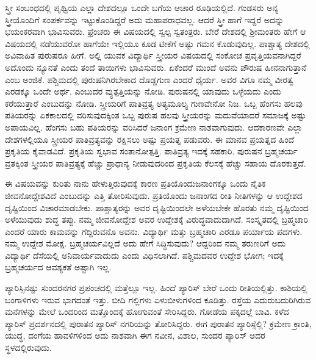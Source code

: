 ಸ್ತ್ರೀ ಸಂಬಂಧದಲ್ಲಿ ಪೃಥ್ವಿಯ ಎಲ್ಲಾ ದೇಶದಲ್ಲೂ ಒಂದೇ ಬಗೆಯ ಆಚಾರ ರೂಢಿಯಲ್ಲಿದೆ. ಗಂಡಸರು ಅನ್ಯ ಸ್ತ್ರೀಯೊಂದಿಗೆ ಸಂಪರ್ಕವನ್ನು ಇಟ್ಟುಕೊಂಡಿದ್ದರೆ ಅದು ಮಹಾಪರಾಧವಲ್ಲ. ಆದರೆ ಸ್ತ್ರೀ ಹಾಗೆ ಇದ್ದರೆ ಅದನ್ನು ಭಯಂಕರವಾಗಿ ಭಾವಿಸುವರು. ಫ್ರೆಂಚರು ಈ ವಿಷಯದಲ್ಲಿ ಸ್ವಲ್ಪ ಸ್ವತಂತ್ರರು. ಬೇರೆ ದೇಶದಲ್ಲಿ ಶ‍್ರೀಮಂತರು ಹೇಗೆ ಆ ವಿಷಯದಲ್ಲಿ ನಡೆಯುವರೋ ಹಾಗೆಯೇ ಇಲ್ಲಿಯೂ ಕೂಡ ಟೀಕೆಗೆ ಅಷ್ಟು ಗಮನ ಕೊಡುವುದಿಲ್ಲ. ಪಾಶ್ಚಾತ್ಯ ದೇಶದಲ್ಲಿ ಅವಿವಾಹಿತ ಪುರುಷರೂ ಹೀಗೆ. ಅಲ್ಲಿ ಯುವಕ ವಿದ್ಯಾರ್ಥಿ ಸ್ತ್ರೀಯರ ವಿಷಯದಲ್ಲಿ ಸಂಕೋಚ ಪ್ರವೃತ್ತಿಯವನಾಗಿದ್ದರೆ ಅದೊಂದು ನ್ಯೂನತೆ ಎಂದು ತಂದೆ ತಾಯಿಗಳು ಭಾವಿಸುವರು. ಏಕೆಂದರೆ ಮುಂದೆ ಅವನು ಪೌರುಷ ಹೀನನಾಗುತ್ತಾನೆ ಎಂಬ ಅಂಜಿಕೆ. ಪಶ್ಚಿಮದಲ್ಲಿ ಪುರುಷನಿಗಿರಬೇಕಾದ ದೊಡ್ಡಗುಣ ಎಂದರೆ ಧೈರ್ಯ. ಅವರ  ವಿಗೂ ನಮ್ಮ ವೀರತ್ವ ಎರಡಕ್ಕೂ ಒಂದೇ ಅರ್ಥ.  ಎಂಬುದರ ವ್ಯುತ್ಪತ್ತಿಯನ್ನು ನೋಡಿ. ಪುರುಷನಲ್ಲಿ ಯಾವುದು ಒಳ್ಳೆಯದು ಎಂದು ಕರೆಯುತ್ತಾರೆ ಎಂಬುದನ್ನು ನೋಡಿ. ಸ್ತ್ರೀಯರಿಗೆ ಪಾತಿವ್ರತ್ಯ ಅತ್ಯಮೂಲ್ಯ ಗುಣವೇನೋ ನಿಜ. ಒಬ್ಬ ಹೆಂಗಸು ಹಲವು ಪತಿಯರನ್ನು ಏಕಕಾಲದಲ್ಲಿ ವರಿಸುವುದಕ್ಕಿಂತ ಒಬ್ಬ ಪುರುಷ ಹಲವು ಸ್ತ್ರೀಯರನ್ನು ಮದುವೆಯಾದರೆ ಸಮಾಜಕ್ಕೆ ಅಷ್ಟು ಅಪಾಯವಿಲ್ಲ. ಹೆಂಗಸು ಬಹು ಪತಿಯರನ್ನು ವರಿಸಿದರೆ ಜನಾಂಗ ಕ್ರಮೇಣ ನಾಶವಾಗುವುದು. ಆದಕಾರಣವೇ ಎಲ್ಲಾ ದೇಶಗಳಲ್ಲಿಯೂ ಸ್ತ್ರೀಯರ ಪಾತಿವ್ರತ್ಯವನ್ನು ರಕ್ಷಿಸಲು ಅಷ್ಟು ಪ್ರಯತ್ನ ಪಡುವರು. ಈ ಮಾನವ ಪ್ರಯತ್ನದ ಹಿಂದೆ ಪ್ರಕೃತಿಯ ಕೈವಾಡವಿದೆ. ಪ್ರಕೃತಿಯ ಸ್ವಭಾವ ಸಂತಾನೋತ್ಪತ್ತಿ. ಪಾತಿವ್ರತ್ಯ ಇದಕ್ಕೆ ಸಹಕಾರಿ. ಪುರುಷನ ಬ್ರಹ್ಮಚರ್ಯ ವ್ರತಕ್ಕಿಂತ ಸ್ತ್ರೀಯರ ಪಾತಿವ್ರತ್ಯಕ್ಕೆ ಹೆಚ್ಚು ಪ್ರಾಧಾನ್ಯ ನೀಡುವುದರಿಂದ ಪ್ರಕೃತಿಯ ಕೆಲಸಕ್ಕೆ ಹೆಚ್ಚು ಸಹಾಯ ದೊರಕುತ್ತದೆ.

ಈ ವಿಷಯವನ್ನು ಕುರಿತು ನಾನು ಹೇಳುತ್ತಿರುವುದಕ್ಕೆ ಕಾರಣ ಪ್ರತಿಯೊಂದು\break ಜನಾಂಗಕ್ಕೂ ಒಂದು ನೈತಿಕ ಜೀವನೋದ್ದೇಶವಿದೆ ಎಂಬುದನ್ನು ಎತ್ತಿ ತೋರಿಸುವುದು. ಪ್ರತಿಯೊಂದು ಜನಾಂಗದ ರೀತಿ ನೀತಿಗಳನ್ನು ಆ ಉದ್ದೇಶದ ದೃಷ್ಟಿಯಿಂದ ವಿಚಾರಮಾಡ\break ಬೇಕು. ಪಾಶ್ಚಾತ್ಯರನ್ನು ಅವರ ದೃಷ್ಟಿಯಿಂದಲೇ ಅಳೆಯಬೇಕೇ ಹೊರತು ನಮ್ಮ ದೃಷ್ಟಿಯಿಂದ ಅಳೆಯುವುದು ಶುದ್ಧ ತಪ್ಪು. ನಮ್ಮ ಜೀವನೋದ್ದೇಶ ಅವರ ಉದ್ದೇಶಕ್ಕೆ ವಿರುದ್ಧ\break ವಾದುದಾಗಿದೆ. ಸಂಸ್ಕೃತದಲ್ಲಿ ಬ್ರಹ್ಮಚಾರಿ ಎಂದರೆ ಯಾರು ಕಾಮವನ್ನು ಗೆದ್ದಿರುವನೊ ಅವನು. ವಿದ್ಯಾರ್ಥಿ ಮತ್ತು ಬ್ರಹ್ಮಚಾರಿ ಎರಡೂ ಪರ್ಯಾಯ ಪದಗಳು. ನಮ್ಮ ಉದ್ದೇಶ ಮೋಕ್ಷ. ಬ್ರಹ್ಮಚರ್ಯವಿಲ್ಲದೆ ಅದು ಹೇಗೆ ಸಿದ್ಧಿಸುವುದು? ಆದ್ದರಿಂದ ನಮ್ಮ ತರುಣರಿಗೆ ಅದು ವಿದ್ಯಾರ್ಥಿ ದೆಸೆಯಲ್ಲಿ ಅನಿವಾರ್ಯವಾದುದು ಎಂದು ವಿಧಿಸಲಾಗಿದೆ. ಪಶ್ಚಿಮದವರ ಉದ್ದೇಶ ಭೋಗ; ಇದಕ್ಕೆ ಬ್ರಹ್ಮಚರ್ಯದ ಆವಶ್ಯಕತೆ ಅಷ್ಟಾಗಿ ಇಲ್ಲ.

\vskip 5pt

ಪ್ಯಾರಿಸ್ಸಿನಷ್ಟು ಸುಂದರನಗರ ಪ್ರಪಂಚದಲ್ಲಿ ಮತ್ತೆಲ್ಲೂ ಇಲ್ಲ. ಹಿಂದೆ ಪ್ಯಾರಿಸ್​ ಬೇರೆ ಒಂದು ರೀತಿಯಲ್ಲಿತ್ತು. ಕಾಶಿಯಲ್ಲಿ ಬಂಗಾಳಿಗಳು ಇರುವ ಭಾಗದಂತೆ ಇತ್ತು. ಬೀದಿ ಗಲ್ಲಿಗಳು ಏಳುಬೀಳುಗಳಿಂದ ಕೂಡಿತ್ತು. ರಸ್ತೆಯ ಎದುರುಬದುರಿಗಿರುವ ಮನೆಗಳನ್ನು ಮೇಲೆ ಒಂದರಿಂದ ಮತ್ತೊಂದಕ್ಕೆ ಹೋಗುವಂತೆ ಸೇರಿಸಿದ್ದರು. ಗೋಡೆಯ ಪಕ್ಕದಲ್ಲೆ ಬಾವಿ. ಕಳೆದ ಪ್ಯಾರಿಸ್​ ಪ್ರದರ್ಶನದಲ್ಲಿ ಪುರಾತನ ಪ್ಯಾರಿಸ್​ ನಗರಿಯನ್ನು ತೋರಿಸಿದ್ದರು. ಈಗ ಪುರಾತನ ಪ್ಯಾರಿಸ್ಸೆಲ್ಲಿ? ಕ್ರಮೇಣ ಕ್ರಾಂತಿ, ಯುದ್ಧ, ದಂಗೆಯ ಹಾವಳಿಗಳಿಂದ ಅದು ನಾಶವಾಗಿ ಈಗ ನವೀನ, ವಿಶಾಲ, ಸುಂದರ ಪ್ಯಾರಿಸ್​ ಅದರ ಸ್ಥಳದಲ್ಲಿರುವುದು.

\vskip 5pt

